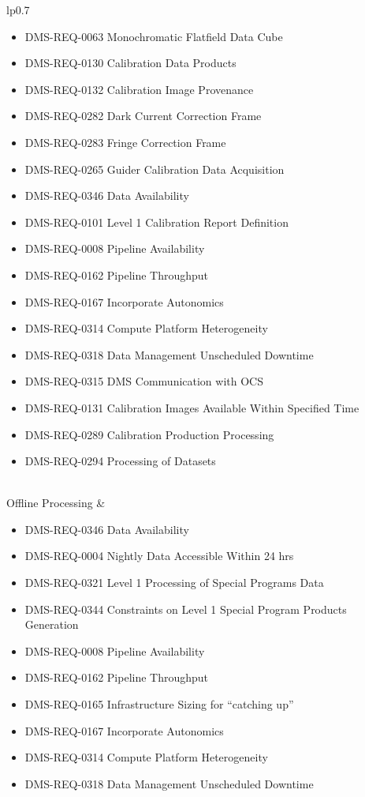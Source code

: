 \begin{xtabular}{lp{0.7\textwidth}}
\begin{itemize}
\item DMS-REQ-0063 Monochromatic Flatfield Data Cube
\item DMS-REQ-0130 Calibration Data Products
\item DMS-REQ-0132 Calibration Image Provenance
\item DMS-REQ-0282 Dark Current Correction Frame
\item DMS-REQ-0283 Fringe Correction Frame
\item DMS-REQ-0265 Guider Calibration Data Acquisition
\item DMS-REQ-0346 Data Availability
\item DMS-REQ-0101 Level 1 Calibration Report Definition
\item DMS-REQ-0008 Pipeline Availability
\item DMS-REQ-0162 Pipeline Throughput
\item DMS-REQ-0167 Incorporate Autonomics
\item DMS-REQ-0314 Compute Platform Heterogeneity
\item DMS-REQ-0318 Data Management Unscheduled Downtime
\item DMS-REQ-0315 DMS Communication with OCS
\item DMS-REQ-0131 Calibration Images Available Within Specified Time
\item DMS-REQ-0289 Calibration Production Processing
\item DMS-REQ-0294 Processing of Datasets
\end{itemize} \\ \hline
Offline Processing &
\begin{itemize}
\item DMS-REQ-0346 Data Availability
\item DMS-REQ-0004 Nightly Data Accessible Within 24 hrs
\item DMS-REQ-0321 Level 1 Processing of Special Programs Data
\item DMS-REQ-0344 Constraints on Level 1 Special Program Products Generation
\item DMS-REQ-0008 Pipeline Availability
\item DMS-REQ-0162 Pipeline Throughput
\item DMS-REQ-0165 Infrastructure Sizing for ``catching up''
\item DMS-REQ-0167 Incorporate Autonomics
\item DMS-REQ-0314 Compute Platform Heterogeneity
\item DMS-REQ-0318 Data Management Unscheduled Downtime

\end{itemize}
\end{xtabular}
